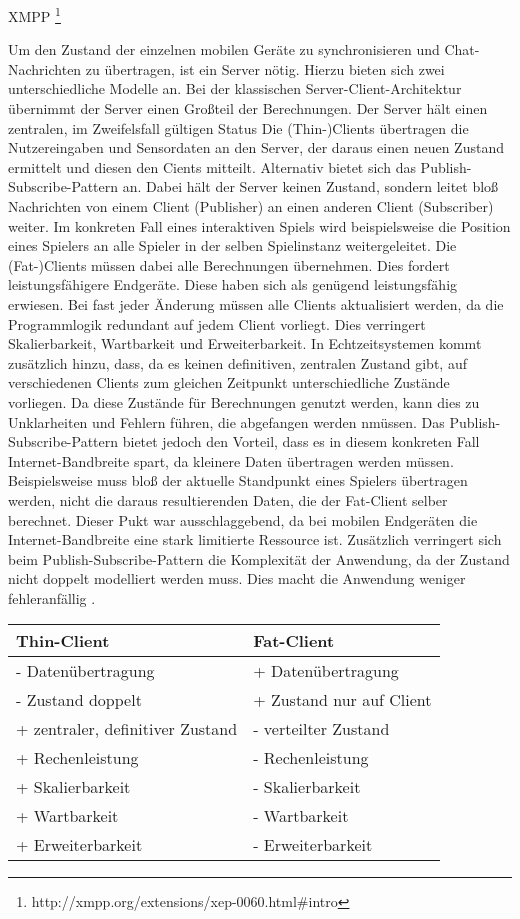 XMPP \footnote{http://xmpp.org/extensions/xep-0060.html#intro}

Um den Zustand der einzelnen mobilen Geräte zu synchronisieren und Chat-Nachrichten zu übertragen, ist ein Server nötig.
Hierzu bieten sich zwei unterschiedliche Modelle an.
Bei der klassischen Server-Client-Architektur übernimmt der Server einen Großteil der Berechnungen.
Der Server hält einen zentralen, im Zweifelsfall gültigen Status
Die (Thin-)Clients übertragen die Nutzereingaben und Sensordaten an den Server, der daraus einen neuen Zustand ermittelt und diesen den Cients mitteilt.
Alternativ bietet sich das Publish-Subscribe-Pattern an. 
Dabei hält der Server keinen Zustand, sondern leitet bloß Nachrichten von einem Client (Publisher) an einen anderen Client (Subscriber) weiter.
Im konkreten Fall eines interaktiven Spiels wird beispielsweise die Position eines Spielers an alle Spieler in der selben Spielinstanz weitergeleitet.
Die (Fat-)Clients müssen dabei alle Berechnungen übernehmen. Dies fordert leistungsfähigere Endgeräte. Diese haben sich als genügend leistungsfähig erwiesen.
Bei fast jeder Änderung müssen alle Clients aktualisiert werden, da die Programmlogik redundant auf jedem Client vorliegt. Dies verringert Skalierbarkeit, Wartbarkeit und Erweiterbarkeit. In Echtzeitsystemen kommt zusätzlich hinzu, dass, da es keinen definitiven, zentralen Zustand gibt, auf verschiedenen Clients zum gleichen Zeitpunkt unterschiedliche Zustände vorliegen. Da diese Zustände für Berechnungen genutzt werden, kann dies zu Unklarheiten und Fehlern führen, die abgefangen werden nmüssen.
Das Publish-Subscribe-Pattern bietet jedoch den Vorteil, dass es in diesem konkreten Fall Internet-Bandbreite spart, da kleinere Daten übertragen werden müssen. Beispielsweise muss bloß der aktuelle Standpunkt eines Spielers übertragen werden, nicht die daraus resultierenden Daten, die der Fat-Client selber berechnet.
Dieser Pukt war ausschlaggebend, da bei mobilen Endgeräten die Internet-Bandbreite eine stark limitierte Ressource ist.
Zusätzlich verringert sich beim Publish-Subscribe-Pattern die Komplexität der Anwendung, da der Zustand nicht doppelt modelliert werden muss. Dies macht die Anwendung weniger fehleranfällig \cite{xmpp, http://www.sigs.de/publications/js/2003/01/schaeffer_JS_01_03.pdf}.

\begin{center}
\begin{tabular}{l|l}
	Thin-Client & Fat-Client \\
	\hline
	 - Datenübertragung & + Datenübertragung \\
	 - Zustand doppelt & + Zustand nur auf Client \\
	 + zentraler, definitiver Zustand &  - verteilter Zustand \\
	 + Rechenleistung & - Rechenleistung \\
	 + Skalierbarkeit & - Skalierbarkeit \\
	 + Wartbarkeit & - Wartbarkeit \\
	 + Erweiterbarkeit & - Erweiterbarkeit \\
\end{tabular}
\end{center}

